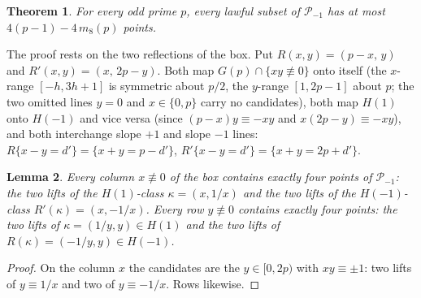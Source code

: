 \documentclass[11pt]{article}
\newtheorem{theorem}{Theorem}
\newtheorem{lemma}[theorem]{Lemma}
\theoremstyle{remark}
\newcommand{\Gp}{G(p)}
\newcommand{\Pset}{\mathcal{P}}
\begin{document}
\begin{theorem}\label{thm:two}
For every odd prime $p$, every lawful subset of $\Pset_{-1}$ has at most $4(p-1)-4\,m_8(p)$ points.
\end{theorem}

The proof rests on the two reflections of the box.  Put $R(x,y)=(p-x,\,y)$ and $R'(x,y)=(x,\,2p-y)$.  Both map $\Gp\cap\{xy\not\equiv0\}$
onto itself (the $x$-range $[-h,3h+1]$ is symmetric about $p/2$, the $y$-range $[1,2p-1]$ about $p$; the two omitted lines
$y=0$ and $x\in\{0,p\}$ carry no candidates), both map $H(1)$ onto $H(-1)$ and vice versa (since $(p-x)y\equiv-xy$ and
$x(2p-y)\equiv-xy$), and both interchange slope $+1$ and slope $-1$ lines: $R\{x-y=d'\}=\{x+y=p-d'\}$, $R'\{x-y=d'\}=\{x+y=2p+d'\}$.

\begin{lemma}\label{lem:rowsRR}
Every column $x\not\equiv0$ of the box contains exactly four points of $\Pset_{-1}$: the two lifts of the $H(1)$-class $\kappa=(x,1/x)$
and the two lifts of the $H(-1)$-class $R'(\kappa)=(x,-1/x)$.  Every row $y\not\equiv0$ contains exactly four points: the two lifts of
$\kappa=(1/y,y)\in H(1)$ and the two lifts of $R(\kappa)=(-1/y,y)\in H(-1)$.
\end{lemma}
\begin{proof}
On the column $x$ the candidates are the $y\in[0,2p)$ with $xy\equiv\pm1$: two lifts of $y\equiv1/x$ and two of $y\equiv-1/x$.  Rows
likewise.
\end{proof}
\end{document}
